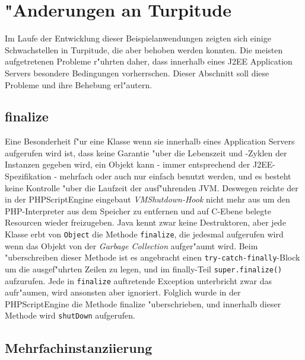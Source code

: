 \section{"Anderungen an Turpitude}
\label{sec:chap2:turp}

Im Laufe der Entwicklung dieser Beispielanwendungen zeigten sich einige Schwachstellen in
Turpitude, die aber behoben werden konnten. Die meisten aufgetretenen Probleme r"uhrten daher,
dass innerhalb eines J2EE Application Servers besondere Bedingungen vorherrschen.
Dieser Abschnitt soll diese Probleme und ihre Behebung erl"autern.

\subsection{finalize}
\label{sec:chap2:turp:final}

Eine Besonderheit f"ur eine Klasse wenn sie innerhalb eines Application Servers aufgerufen wird
ist, dass keine Garantie "uber die Lebenszeit und -Zyklen der Instanzen gegeben wird, ein Objekt kann
- immer entsprechend der J2EE-Spezifikation - mehrfach oder auch nur einfach benutzt werden, und
es besteht keine Kontrolle "uber die Laufzeit der ausf"uhrenden JVM.
Deswegen reichte der in der PHPScriptEngine eingebaut \emph{VMShutdown-Hook} nicht mehr aus um
den PHP-Interpreter aus dem Speicher zu entfernen und auf C-Ebene belegte Resourcen wieder
freizugeben. Java kennt zwar keine Destruktoren, aber jede Klasse erbt von \texttt{Object} die
Methode \texttt{finalize}, die jedesmal aufgerufen wird wenn das Objekt von der \emph{Garbage Collection}
aufger"aumt wird. 
Beim "uberschreiben dieser Methode ist es angebracht einen \texttt{try-catch-finally}-Block
um die ausgef"uhrten Zeilen zu legen, und im finally-Teil \texttt{super.finalize()} aufzurufen.
Jede in \texttt{finalize} auftretende Exception unterbricht zwar das aufr"aumen, wird ansonsten
aber ignoriert.
Folglich wurde in der PHPScriptEngine die Methode finalize "uberschrieben, und innerhalb dieser
Methode wird \texttt{shutDown} aufgerufen.

\subsection{Mehrfachinstanziierung}
\label{sec:chap2:turp:multi}

